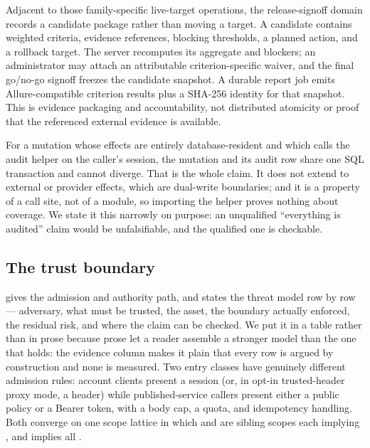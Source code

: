 Adjacent to those family-specific live-target operations, the release-signoff
domain records a candidate package rather than moving a target.  A candidate
contains weighted criteria, evidence references, blocking thresholds, a planned
action, and a rollback target.  The server recomputes its aggregate and blockers;
an administrator may attach an attributable criterion-specific waiver, and the
final go/no-go signoff freezes the candidate snapshot.  A durable report job emits
Allure-compatible criterion results plus a SHA-256 identity for that snapshot.
This is evidence packaging and accountability, not distributed atomicity or proof
that the referenced external evidence is available.

 For a mutation whose effects are
entirely database-resident and which calls the audit helper on the caller's
session, the mutation and its audit row share one SQL transaction and cannot
diverge. That is the whole claim. It does not extend to external \mlflow{} or
provider effects, which are dual-write boundaries; and it is a property of a call
site, not of a module, so importing the helper proves nothing about coverage. We
state it this narrowly on purpose: an unqualified ``everything is audited'' claim
would be unfalsifiable, and the qualified one is checkable.

\subsection{The trust boundary}



 gives the admission and authority path, and
 states the threat model row by row --- adversary, what must be
trusted, the asset, the boundary actually enforced, the residual risk, and where the
claim can be checked. We put it in a table rather than in prose because prose let a
reader assemble a stronger model than the one that holds: the evidence column makes
it plain that every row is argued by construction and none is measured. Two entry classes have
genuinely different admission rules: account clients present a session (or, in
opt-in trusted-header proxy mode, a header) while published-service callers present
either a public policy or a Bearer token, with a body cap, a quota, and
idempotency handling. Both converge on one scope lattice in which \operator{} and
\approver{} are sibling scopes each implying \viewer{}, and \admin{} implies all
\statScopesW{}.

